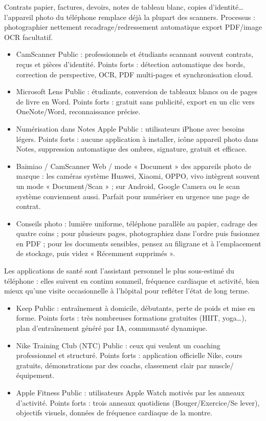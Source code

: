 Contrats papier, factures, devoirs, notes de tableau blanc, copies d'identité… l'appareil photo du téléphone remplace déjà la plupart des scanners. Processus : photographier nettement recadrage/redressement automatique export PDF/image OCR facultatif.

\begin{itemize}
  \item CamScanner Public : professionnels et étudiants scannant souvent contrats, reçus et pièces d'identité. Points forts : détection automatique des bords, correction de perspective, OCR, PDF multi-pages et synchronisation cloud.
  \item Microsoft Lens Public : étudiants, conversion de tableaux blancs ou de pages de livre en Word. Points forts : gratuit sans publicité, export en un clic vers OneNote/Word, reconnaissance précise.
  \item Numérisation dans Notes Apple Public : utilisateurs iPhone avec besoins légers. Points forts : aucune application à installer, icône appareil photo dans Notes, suppression automatique des ombres, signature, gratuit et efficace.
  \item Baimiao / CamScanner Web / mode « Document » des appareils photo de marque : les caméras système Huawei, Xiaomi, OPPO, vivo intègrent souvent un mode « Document/Scan » ; sur Android, Google Camera ou le scan système conviennent aussi. Parfait pour numériser en urgence une page de contrat.
  \item Conseils photo : lumière uniforme, téléphone parallèle au papier, cadrage des quatre coins ; pour plusieurs pages, photographiez dans l'ordre puis fusionnez en PDF ; pour les documents sensibles, pensez au filigrane et à l'emplacement de stockage, puis videz « Récemment supprimés ».
\end{itemize}


Les applications de santé sont l'assistant personnel le plus sous-estimé du téléphone : elles suivent en continu sommeil, fréquence cardiaque et activité, bien mieux qu'une visite occasionnelle à l'hôpital pour refléter l'état de long terme.


\begin{itemize}
  \item Keep Public : entraînement à domicile, débutants, perte de poids et mise en forme. Points forts : très nombreuses formations gratuites (HIIT, yoga…), plan d'entraînement généré par IA, communauté dynamique.
  \item Nike Training Club (NTC) Public : ceux qui veulent un coaching professionnel et structuré. Points forts : application officielle Nike, cours gratuits, démonstrations par des coachs, classement clair par muscle/équipement.
  \item Apple Fitness Public : utilisateurs Apple Watch motivés par les anneaux d'activité. Points forts : trois anneaux quotidiens (Bouger/Exercice/Se lever), objectifs visuels, données de fréquence cardiaque de la montre.
\end{itemize}

